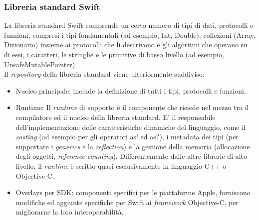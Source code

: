\subsubsection{Libreria standard Swift}
La libreria standard Swift comprende un certo numero di tipi di dati, protocolli e funzioni, compresi i tipi fondamentali (ad esempio, Int, Double), collezioni (Array, Dizionario) insieme ai protocolli che li descrivono e gli algoritmi che operano su di essi, i caratteri, le stringhe e le primitive di basso livello (ad esempio, UnsafeMutablePointer).\\
Il \textit{repository} della libreria standard viene ulteriormente suddiviso:
\begin{itemize}
\item Nucleo principale: include la definizione di tutti i tipi, protocolli e funzioni.
\item Runtime: Il \textit{runtime} di supporto è il componente che risiede nel mezzo tra il compilatore ed il nucleo della libreria standard. E' il responsabile dell'implementazione delle caratteristiche dinamiche del linguaggio, come il \textit{casting}  (ad esempio per gli operatori as! ed as?), i metadata dei tipi (per supportare i \textit{generics} e la \textit{reflection}) e la gestione della memoria (allocazione degli oggetti, \textit{reference counting}). Differentemente dalle altre librerie di alto livello, il \textit{runtime} è scritto quasi esclusivamente in linguaggio C++ o Objective-C.
\item Overlays per SDK: componenti specifici per le piattaforme Apple, forniscono modifiche ed aggiunte specifiche per Swift ai \textit{framework} Objective-C, per migliorarne la loro interoperabilità. 
\end{itemize}
